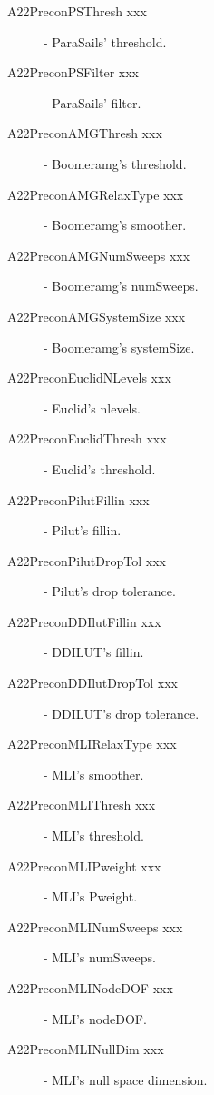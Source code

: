 \begin{description}
\item[A22PreconPSThresh xxx] - ParaSails' threshold.
\item[A22PreconPSFilter xxx] - ParaSails' filter.
\item[A22PreconAMGThresh xxx] - Boomeramg's threshold.
\item[A22PreconAMGRelaxType xxx] - Boomeramg's smoother.
\item[A22PreconAMGNumSweeps xxx] - Boomeramg's numSweeps.
\item[A22PreconAMGSystemSize xxx] - Boomeramg's systemSize.
\item[A22PreconEuclidNLevels xxx] - Euclid's nlevels.
\item[A22PreconEuclidThresh xxx] - Euclid's threshold.
\item[A22PreconPilutFillin xxx] - Pilut's fillin.
\item[A22PreconPilutDropTol xxx] - Pilut's drop tolerance.
\item[A22PreconDDIlutFillin xxx] - DDILUT's fillin.
\item[A22PreconDDIlutDropTol xxx] - DDILUT's drop tolerance.
\item[A22PreconMLIRelaxType xxx] - MLI's smoother.
\item[A22PreconMLIThresh xxx] - MLI's threshold.
\item[A22PreconMLIPweight xxx] - MLI's Pweight.
\item[A22PreconMLINumSweeps xxx] - MLI's numSweeps.
\item[A22PreconMLINodeDOF xxx] - MLI's nodeDOF.
\item[A22PreconMLINullDim xxx] - MLI's null space dimension.
\end{description}

